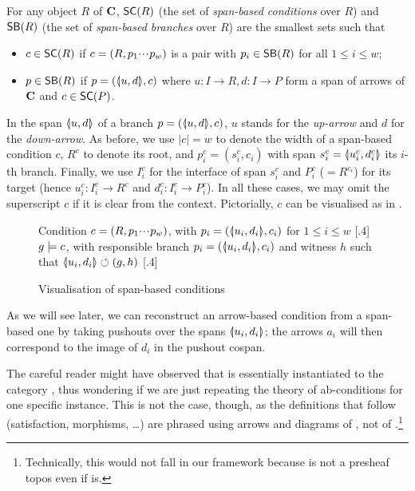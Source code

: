 \begin{definition}
  For any object $R$ of $\mathbf{C}$, $\SC R$ (the set of \emph{span-based conditions} over $R$) and $\SB R$ (the set of \emph{span-based branches} over $R$) are the smallest sets such that
  \begin{itemize}
  \item $c\in \SC R$ if $c=(R,p_1{\cdotp\mkern-2mu\cdotp\mkern-2mu\cdotp\mkern1mu} p_w)$ is a pair with $p_i\in \SB R$ for all $1\leq i\leq w$;
  \item $p\in \SB R$ if $p=(\spanof u d,c)$ where $u: I\to R, d:I\to P$ form a span of arrows of $\mathbf{C}$ and $c\in \SC P$.
  \end{itemize}
\end{definition}
%
In the span $\spanof u d$ of a branch $p=(\spanof u d,c)$, $u$ stands for the \emph{up-arrow} and $d$ for the \emph{down-arrow}. As before, we use $|c|=w$ to denote the width of a span-based condition $c$, $R^c$ to denote its root, and $p^c_i=(s^c_i,c_i)$ with span $s^c_i=\spanof{u^c_i}{d^c_i}$ its $i$-th branch. Finally, we use $I^c_i$ for the interface of span $s^c_i$ and $P^c_i$ ($=R^{c_i}$) for its target (hence $u^c_i:I^c_i\to R^c$ and $d^c_i:I^c_i\rightarrow P^c_i$). In all these cases, we may omit the superscript $c$ if it is clear from the context. Pictorially, $c$ can be visualised as in .
%
\begin{figure}
\centering
\subcaptionbox
  {Condition $c=(R,p_1{\cdotp\mkern-2mu\cdotp\mkern-2mu\cdotp\mkern1mu} p_w)$, with $p_i=(\spanof{u_i}{d_i},c_i)$ for $1\leq i\leq w$
   }
  [.4\textwidth]
  {}
\qquad
\subcaptionbox
  {$g\models c$, with responsible branch $p_i=(\spanof{u_i}{d_i},c_i)$ and witness $h$ such that $\spanof{u_i}{d_i}\commutes (g,h)$
   }
  [.4\textwidth]
  {}
\caption{Visualisation of span-based conditions}
\end{figure}
%
As we will see later, we can reconstruct an arrow-based condition from a span-based one by taking pushouts over the spans $\spanof{u_i}{d_i}$; the arrows $a_i$ will then correspond to the image of $d_i$ in the pushout cospan.

\medskip\noindent The careful reader might have observed that  is essentially  instantiated to the category {\SpanC}, thus wondering if we are just repeating the theory of ab-conditions for one specific instance. This is not the case, though, as the definitions that follow (satisfaction, morphisms, \ldots) are phrased using arrows and diagrams of , not of {\SpanC}.\footnote{Technically, this would not fall in our framework because {\SpanC} is not a presheaf topos even if  is.}

